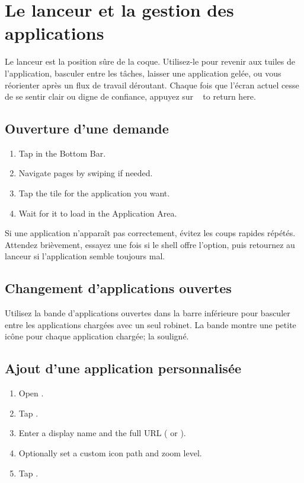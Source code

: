 \chapter{Le lanceur et la gestion des applications}
\label{ch:launcher}

Le lanceur est la position sûre de la coque.
Utilisez-le pour revenir aux tuiles de l'application, basculer entre les tâches, laisser une application gelée, ou
vous réorienter après un flux de travail déroutant.
Chaque fois que l'écran actuel cesse de se sentir clair ou digne de confiance, appuyez sur
~ to return here.


\section{Ouverture d'une demande}

\begin{enumerate}
  \item Tap  in the Bottom Bar.
  \item Navigate pages by swiping if needed.
  \item Tap the tile for the application you want.
  \item Wait for it to load in the Application Area.
\end{enumerate}

Si une application n'apparaît pas correctement, évitez les coups rapides répétés.
Attendez brièvement, essayez une fois si le shell offre l'option, puis retournez au lanceur
si l'application semble toujours mal.

\section{Changement d'applications ouvertes}

Utilisez la bande d'applications ouvertes dans la barre inférieure pour basculer entre les applications chargées
avec un seul robinet.
La bande montre une petite icône pour chaque application chargée; la
souligné.

\section{Ajout d'une application personnalisée}

\begin{enumerate}
  \item Open .
  \item Tap .
  \item Enter a display name and the full URL ( or ).
  \item Optionally set a custom icon path and zoom level.
  \item Tap .
\end{enumerate}

